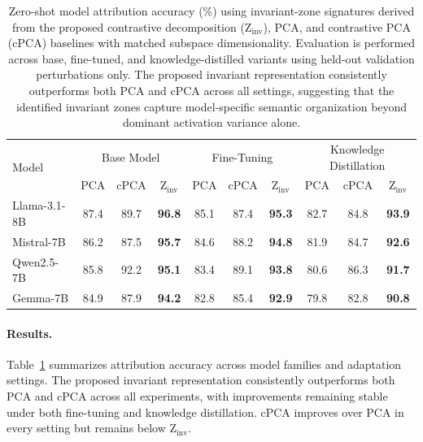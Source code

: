 \begin{table}[!ht]
\centering
\small
\vspace{-1.0em}
\setlength{\tabcolsep}{5pt}
\renewcommand{\arraystretch}{1.2}
\begin{tabular}{l|ccc|ccc|ccc}
\hline
\multirow{2}{*}{Model}
& \multicolumn{3}{c|}{Base Model}
& \multicolumn{3}{c|}{Fine-Tuning}
& \multicolumn{3}{c}{Knowledge Distillation} \\

& PCA & cPCA & Z$_{\text{inv}}$
& PCA & cPCA & Z$_{\text{inv}}$
& PCA & cPCA & Z$_{\text{inv}}$ \\

\hline

Llama-3.1-8B
& 87.4 & 89.7 & \textbf{96.8}
& 85.1 & 87.4 & \textbf{95.3}
& 82.7 & 84.8 & \textbf{93.9} \\

Mistral-7B
& 86.2 & 87.5 & \textbf{95.7}
& 84.6 & 88.2 & \textbf{94.8}
& 81.9 & 84.7 & \textbf{92.6} \\

Qwen2.5-7B
& 85.8 & 92.2 & \textbf{95.1}
& 83.4 & 89.1 & \textbf{93.8}
& 80.6 & 86.3 & \textbf{91.7} \\

Gemma-7B
& 84.9 & 87.9 & \textbf{94.2}
& 82.8 & 85.4 & \textbf{92.9}
& 79.8 & 82.8 & \textbf{90.8} \\

\hline
\end{tabular}
\vspace{0.4em}
\caption{Zero-shot model attribution accuracy (\%) using invariant-zone signatures derived from the proposed contrastive decomposition (Z$_{\mathrm{inv}}$), PCA, and contrastive PCA (cPCA) baselines with matched subspace dimensionality. Evaluation is performed across base, fine-tuned, and knowledge-distilled variants using held-out validation perturbations only. The proposed invariant representation consistently outperforms both PCA and cPCA across all settings, suggesting that the identified invariant zones capture model-specific semantic organization beyond dominant activation variance alone.}
\label{tab:model_attribution_comparison}
\end{table} %

\paragraph{Results.}
Table~\ref{tab:model_attribution_comparison} summarizes attribution accuracy across model families and adaptation settings.
The proposed invariant representation consistently outperforms both PCA and cPCA across all experiments, with improvements remaining stable under both fine-tuning and knowledge distillation. cPCA improves over PCA in every setting but remains below Z$_{\mathrm{inv}}$. %

